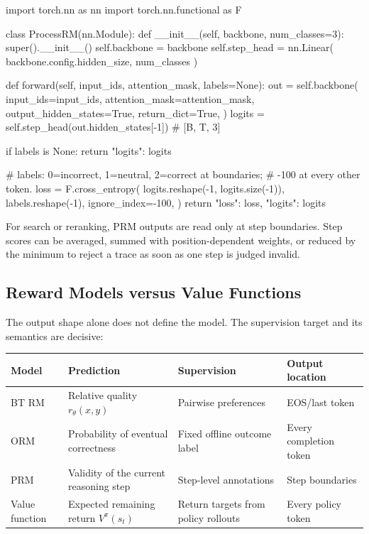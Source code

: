 \begin{codeblock}[language=Python,caption={Three-class process reward model.}]
import torch.nn as nn
import torch.nn.functional as F

class ProcessRM(nn.Module):
    def __init__(self, backbone, num_classes=3):
        super().__init__()
        self.backbone = backbone
        self.step_head = nn.Linear(
            backbone.config.hidden_size, num_classes
        )

    def forward(self, input_ids, attention_mask, labels=None):
        out = self.backbone(
            input_ids=input_ids,
            attention_mask=attention_mask,
            output_hidden_states=True,
            return_dict=True,
        )
        logits = self.step_head(out.hidden_states[-1])  # [B, T, 3]

        if labels is None:
            return {"logits": logits}

        # labels: 0=incorrect, 1=neutral, 2=correct at boundaries;
        #         -100 at every other token.
        loss = F.cross_entropy(
            logits.reshape(-1, logits.size(-1)),
            labels.reshape(-1),
            ignore_index=-100,
        )
        return {"loss": loss, "logits": logits}
\end{codeblock}

For search or reranking, PRM outputs are read only at step boundaries.  Step
scores can be averaged, summed with position-dependent weights, or reduced by
the minimum to reject a trace as soon as one step is judged invalid.

\subsection{Reward Models versus Value Functions}

The output shape alone does not define the model.  The supervision target and
its semantics are decisive:

\begin{center}
\small
\begin{tabularx}{\textwidth}{@{}l X X l@{}}
\toprule
Model & Prediction & Supervision & Output location \\
\midrule
BT RM
& Relative quality $r_\theta(x,y)$
& Pairwise preferences
& EOS/last token \\
ORM
& Probability of eventual correctness
& Fixed offline outcome label
& Every completion token \\
PRM
& Validity of the current reasoning step
& Step-level annotations
& Step boundaries \\
Value function
& Expected remaining return $V^\pi(s_t)$
& Return targets from policy rollouts
& Every policy token \\
\bottomrule
\end{tabularx}
\end{center}

